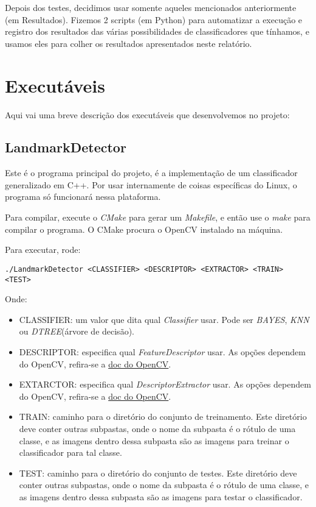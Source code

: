 Depois dos testes, decidimos usar somente aqueles mencionados anteriormente (em Resultados).
Fizemos 2 scripts (em Python) para automatizar a execução e registro dos resultados das várias 
possibilidades de classificadores que tínhamos, e usamos eles para colher os resultados apresentados
neste relatório.

\section{Executáveis}
Aqui vai uma breve descrição dos executáveis que desenvolvemos no projeto:

\subsection{LandmarkDetector}
Este é o programa principal do projeto, é a implementação de um classificador generalizado em C++.
Por usar internamente de coisas específicas do Linux, o programa só funcionará nessa plataforma.

Para compilar, execute o \textit{CMake} para gerar um \textit{Makefile}, e então use o \textit{make}
para compilar o programa. O CMake procura o OpenCV instalado na máquina.

Para executar, rode:
\begin{small}
\begin{verbatim}
./LandmarkDetector <CLASSIFIER> <DESCRIPTOR> <EXTRACTOR> <TRAIN> <TEST>
\end{verbatim}
\end{small}
Onde:
\begin{itemize}
  \item CLASSIFIER: um valor que dita qual \textit{Classifier} usar. Pode ser \textit{BAYES}, \textit{KNN}
        ou \textit{DTREE}(árvore de decisão).
  \item DESCRIPTOR: especifica qual \textit{FeatureDescriptor} usar. As opções dependem do OpenCV, refira-se
        a \hyperref{http://docs.opencv.org/modules/features2d/doc/common_interfaces_of_feature_detectors.html}{}{featuredetector-create}{doc do OpenCV}.
  \item EXTARCTOR: especifica qual \textit{DescriptorExtractor} usar. As opções dependem do OpenCV, refira-se
        a \hyperref{http://docs.opencv.org/modules/features2d/doc/common_interfaces_of_descriptor_extractors.html}{}{descriptorextractor-create}{doc do OpenCV}.
  \item TRAIN: caminho para o diretório do conjunto de treinamento. Este diretório deve conter outras subpastas, 
        onde o nome da subpasta é o rótulo de uma classe, e as imagens dentro dessa subpasta são as imagens para
        treinar o classificador para tal classe.
  \item TEST: caminho para o diretório do conjunto de testes. Este diretório deve conter outras subpastas, 
        onde o nome da subpasta é o rótulo de uma classe, e as imagens dentro dessa subpasta são as imagens para
        testar o classificador.
\end{itemize}

